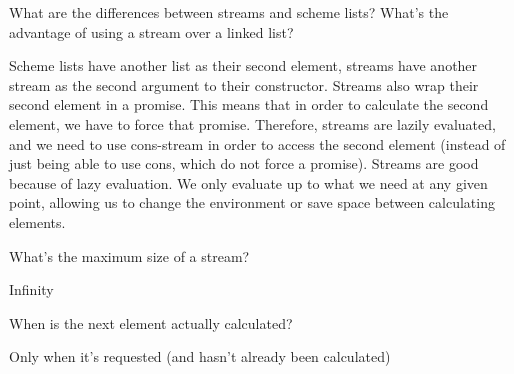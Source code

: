 \begin{blocksection}
\question What are the differences between streams and scheme lists? What's the advantage of using a stream 
over a linked list?
\begin{solution}[1.0in]
Scheme lists have another list as their second element, streams have another stream as the second argument to
their constructor.
Streams also wrap their second element in a promise. This means that in order to calculate the second element,
we have to force that promise. Therefore, streams are lazily evaluated, and we need to use cons-stream in order
to access the second element (instead of just being able to use cons, which do not force a promise).
Streams are good because of lazy evaluation. We only evaluate up to what we need at any given point, allowing
us to change the environment or save space between calculating elements.
\end{solution}

\question What's the maximum size of a stream?
\begin{solution}[1.0in]
Infinity
\end{solution}

\question When is the next element actually calculated?
\begin{solution}[1.0in]
Only when it's requested (and hasn't already been calculated)
\end{solution}
\end{blocksection}
